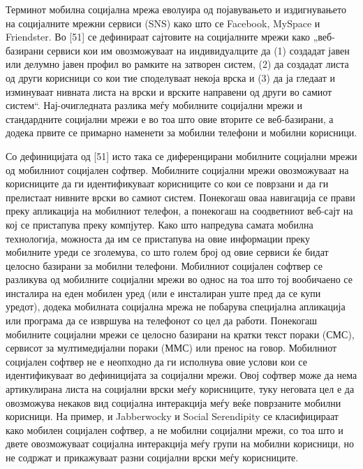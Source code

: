 Терминот мобилна социјална мрежа еволуира од појавувањето и издигнувањето на
социјалните мрежни сервиси (SNS) како што се Facebook, MySpace и Friendster. Во
[51] се дефинираат сајтовите на социјалните мрежи како „веб-базирани сервиси кои
им овозможуваат на индивидуалците да (1) создадат јавен или делумно јавен профил
во рамките на затворен систем, (2) да создадат листа од други корисници со кои
тие споделуваат некоја врска и (3) да ја гледаат и изминуваат нивната листа на
врски и врските направени од други во самиот систем“. Нај-очигледната разлика
меѓу мобилните социјални мрежи и стандардните социјални мрежи е во тоа што овие
вторите се веб-базирани, а додека првите се примарно наменети за мобилни
телефони и мобилни корисници.

Со дефиницијата од [51] исто така се диференцирани мобилните социјални мрежи од
мобилниот социјален софтвер. Мобилните социјални мрежи овозможуваат на
корисниците да ги идентификуваат корисниците со кои се поврзани и да ги
прелистаат нивните врски во самиот систем. Понекогаш оваа навигација се прави
преку апликација на мобилниот телефон, а понекогаш на соодветниот веб-сајт на
кој се пристапува преку компјутер. Како што напредува самата мобилна
технологија, можноста да им се пристапува на овие информации преку мобилните
уреди се зголемува, со што голем број од овие сервиси ќе бидат целосно базирани
за мобилни телефони. Мобилниот социјален софтвер се разликува од мобилните
социјални мрежи во однос на тоа што тој вообичаено се инсталира на еден мобилен
уред (или е инсталиран уште пред да се купи уредот), додека мобилната социјална
мрежа не побарува специјална апликација или програма да се извршува на телефонот
со цел да работи. Понекогаш мобилните социјални мрежи се целосно базирани на
кратки текст пораки (СМС), сервисот за мултимедијални пораки (ММС) или пренос на
говор. Мобилниот социјален софтвер не е неопходно да ги исполнува овие услови
кои се идентификуваат во дефиницијата за социјални мрежи. Овој софтвер може да
нема артикулирана листа на социјални врски меѓу корисниците, туку неговата цел е
да овозможува некаков вид социјална интеракција меѓу веќе поврзаните мобилни
корисници. На пример, и Jabberwocky и Social Serendipity се класифицираат како
мобилен социјален софтвер, а не мобилни социјални мрежи, со тоа што и двете
овозможуваат социјална интеракција меѓу групи на мобилни корисници, но не
содржат и прикажуваат разни социјални врски меѓу корисниците.

